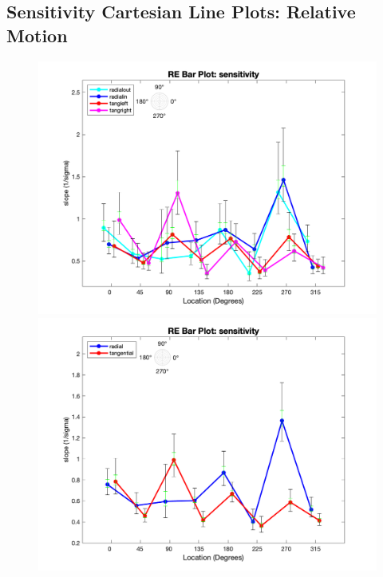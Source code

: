 \documentclass[11pt]{article} %
\begin{document}
\subsection{Sensitivity Cartesian Line Plots: Relative Motion}
\begin{figure}[H]
\centering %
\includegraphics[scale=.3]{Images/RE_LP_sensitivity_Alldata_4conds.png}
\includegraphics[scale=.3]{Images/RE_LP_sensitivity_Alldata_2conds.png}
\end{figure}
\end{document}
